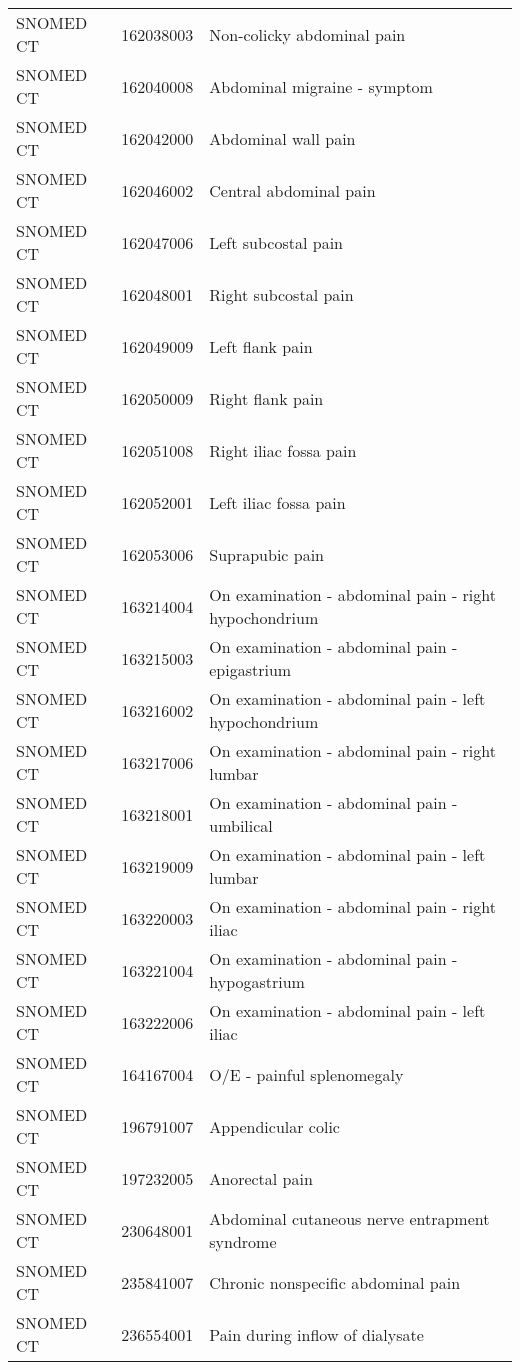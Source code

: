 \begin{longtable}{p{}p{}p{}}
  SNOMED CT & 162038003 & Non-colicky abdominal pain \\ 
  SNOMED CT & 162040008 & Abdominal migraine - symptom \\ 
  SNOMED CT & 162042000 & Abdominal wall pain \\ 
  SNOMED CT & 162046002 & Central abdominal pain \\ 
  SNOMED CT & 162047006 & Left subcostal pain \\ 
  SNOMED CT & 162048001 & Right subcostal pain \\ 
  SNOMED CT & 162049009 & Left flank pain \\ 
  SNOMED CT & 162050009 & Right flank pain \\ 
  SNOMED CT & 162051008 & Right iliac fossa pain \\ 
  SNOMED CT & 162052001 & Left iliac fossa pain \\ 
  SNOMED CT & 162053006 & Suprapubic pain \\ 
  SNOMED CT & 163214004 & On examination - abdominal pain - right hypochondrium \\ 
  SNOMED CT & 163215003 & On examination - abdominal pain - epigastrium \\ 
  SNOMED CT & 163216002 & On examination - abdominal pain - left hypochondrium \\ 
  SNOMED CT & 163217006 & On examination - abdominal pain - right lumbar \\ 
  SNOMED CT & 163218001 & On examination - abdominal pain - umbilical \\ 
  SNOMED CT & 163219009 & On examination - abdominal pain - left lumbar \\ 
  SNOMED CT & 163220003 & On examination - abdominal pain - right iliac \\ 
  SNOMED CT & 163221004 & On examination - abdominal pain - hypogastrium \\ 
  SNOMED CT & 163222006 & On examination - abdominal pain - left iliac \\ 
  SNOMED CT & 164167004 & O/E - painful splenomegaly \\ 
  SNOMED CT & 196791007 & Appendicular colic \\ 
  SNOMED CT & 197232005 & Anorectal pain \\ 
  SNOMED CT & 230648001 & Abdominal cutaneous nerve entrapment syndrome \\ 
  SNOMED CT & 235841007 & Chronic nonspecific abdominal pain \\ 
  SNOMED CT & 236554001 & Pain during inflow of dialysate \\ 

\end{longtable}
